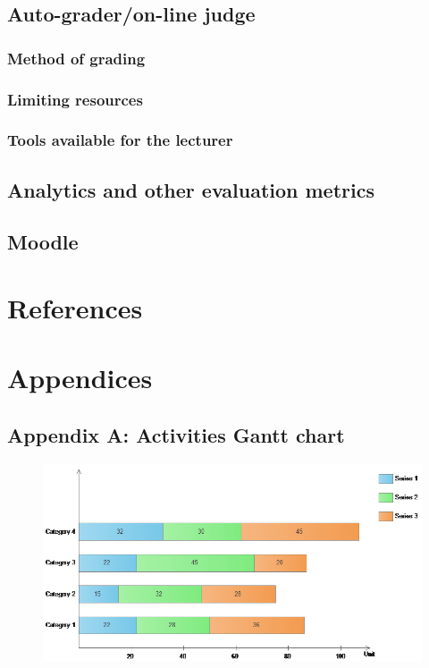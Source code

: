 \documentclass[12pt]{article}
\begin{document}
	\subsection{Auto-grader/on-line judge}
		\subsubsection{Method of grading}
		\subsubsection{Limiting resources}
		\subsubsection{Tools available for the lecturer}
	\subsection{Analytics and other evaluation metrics}
	\subsection{Moodle}

\section{References}

\section{Appendices}
	\subsection{Appendix A: Activities Gantt chart}
	\begin{figure}
		\begin{center} \includegraphics[width=0.8\linewidth]{gantt.png} \end{center}
	\end{figure}
\end{document}

